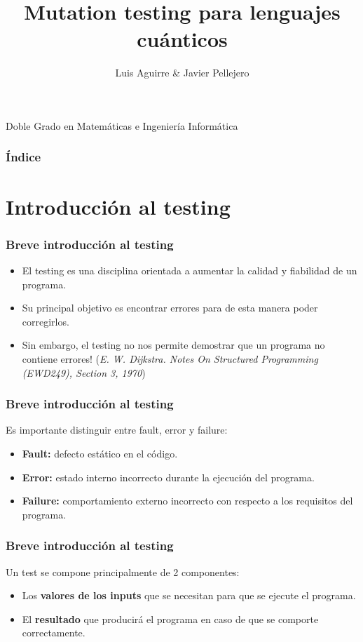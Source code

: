 \documentclass{beamer}
\title[Computación Cuántica]{Mutation testing para lenguajes cuánticos}
\author{Luis Aguirre \& Javier Pellejero}
\institute[UCM]{Universidad Complutense de Madrid\\ Facultad de Informática}
\begin{document}
\begin{frame}
	\titlepage
	\begin{center} Doble Grado en Matemáticas e Ingeniería Informática\end{center}
\end{frame}

\begin{frame}
\frametitle{Índice}
	\tableofcontents
\end{frame}

\section{Introducción al testing}

\begin{frame}
	\frametitle{Breve introducción al testing}
	\begin{itemize}
	\item El testing es una disciplina orientada a aumentar la calidad y fiabilidad de un programa.
	\item Su principal objetivo es encontrar errores para de esta manera poder corregirlos.
	\item Sin embargo, el testing no nos permite demostrar que un programa no contiene errores! (\textit{E. W. Dijkstra. Notes On Structured
Programming (EWD249), Section 3, 1970})
	\end{itemize}
\end{frame}

\begin{frame}
	\frametitle{Breve introducción al testing}
	Es importante distinguir entre fault, error y failure:
	
	\begin{itemize}
	\item \textbf{Fault:} defecto estático en el código.
	\item \textbf{Error:} estado interno incorrecto durante la ejecución del programa.
	\item \textbf{Failure:} comportamiento externo incorrecto con respecto a los requisitos del programa.
	\end{itemize}
			
\end{frame}

\begin{frame}
	\frametitle{Breve introducción al testing}
	Un test se compone principalmente de 2 componentes:

	\begin{itemize}
	\item Los \textbf{valores de los inputs} que se necesitan para que se ejecute el programa.
	\item  El \textbf{resultado} que producirá el programa en caso de que se comporte correctamente.
	\end{itemize}
			
\end{frame}
\end{document}
